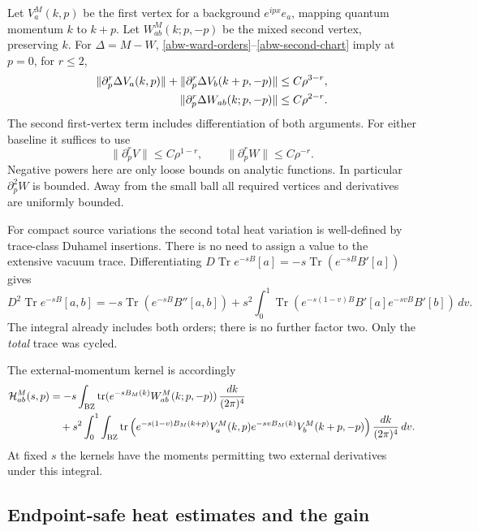 Let \(V_a^M(k,p)\) be the first vertex for a background
\(e^{ipx}e_a\), mapping quantum momentum \(k\) to \(k+p\).
Let \(W_{ab}^M(k;p,-p)\) be the mixed second vertex, preserving \(k\).
For \(\Delta=M-W\), \eqref{abw-ward-orders}--\eqref{abw-second-chart}
imply at \(p=0\), for \(r\le2\),
\begin{align}
 \|\partial_p^r\Delta V_a(k,p)\|
 +\|\partial_p^r\Delta V_b(k+p,-p)\|
       &\le C\rho^{3-r},\notag\\
 \|\partial_p^r\Delta W_{ab}(k;p,-p)\|
       &\le C\rho^{2-r}.
 \label{abw-vertex-difference}
\end{align}
The second first-vertex term includes differentiation of both arguments.
For either baseline it suffices to use
\begin{equation}
 \|\partial_p^rV\|\le C\rho^{1-r},\qquad
 \|\partial_p^rW\|\le C\rho^{-r}.
 \label{abw-baseline-vertices}
\end{equation}
Negative powers here are only loose bounds on analytic functions.
In particular \(\partial_p^2W\) is bounded. Away from the small ball all
required vertices and derivatives are uniformly bounded.

For compact source variations the second total heat variation is
well-defined by trace-class Duhamel insertions. There is no need to assign
a value to the extensive vacuum trace. Differentiating
\(D\operatorname{Tr}e^{-sB}[a]=-s\operatorname{Tr}(e^{-sB}B'[a])\)
gives
\begin{equation}
 D^2\operatorname{Tr}e^{-sB}[a,b]
 =-s\operatorname{Tr}(e^{-sB}B''[a,b])
 +s^2\int_0^1\operatorname{Tr}
  (e^{-s(1-v)B}B'[a]e^{-svB}B'[b])\,dv.
 \label{abw-total-duhamel}
\end{equation}
The integral already includes both orders; there is no further factor
two. Only the \emph{total} trace was cycled.

The external-momentum kernel is accordingly
\begin{align}
 {\cal H}_{ab}^M(s,p)
 &=-s\int_{\mathrm{BZ}}\operatorname{tr}
       (e^{-sB_M(k)}W_{ab}^M(k;p,-p))\,\frac{dk}{(2\pi)^4}
       \notag\\
 &\quad+s^2\int_0^1\int_{\mathrm{BZ}}\operatorname{tr}
 \left(e^{-s(1-v)B_M(k+p)}V_a^M(k,p)
       e^{-svB_M(k)}V_b^M(k+p,-p)\right)
                          \frac{dk}{(2\pi)^4}\,dv.
 \label{abw-diagram}
\end{align}
At fixed \(s\) the kernels have the moments permitting two external
derivatives under this integral.

\subsection{Endpoint-safe heat estimates and the gain}
\label{abw-estimate-section}

